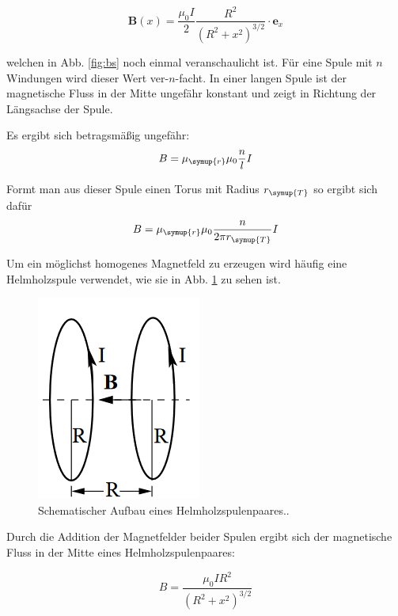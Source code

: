 \begin{equation}
  \symbf{B}(x)=\frac{\mu_0I}{2}\frac{R^2}{\left(R^2+x^2\right)^{3/2}}\cdot \symbf{e}_x
  \label{eqn:bswdg}
\end{equation}

welchen in Abb. \ref{fig:bs} noch einmal veranschaulicht ist.
Für eine Spule mit $n$ Windungen wird dieser Wert ver-$n$-facht.
In einer langen Spule ist der magnetische Fluss in der Mitte ungefähr
konstant und zeigt in Richtung der Längsachse der Spule.

Es ergibt sich betragsmäßig ungefähr:
\begin{equation}
  B = \mu_{\symup{r}}\mu_0\frac{n}{l}I
  \label{eqn:Bspule}
\end{equation}

Formt man aus dieser Spule einen Torus mit Radius $r_{\symup{T}}$
so ergibt sich dafür
\begin{equation}
  B = \mu_{\symup{r}}\mu_0\frac{n}{2\pi r_{\symup{T}}}I
  \label{eqn:Btorus}
\end{equation}

Um ein möglichst homogenes Magnetfeld zu erzeugen wird häufig
eine Helmholzspule verwendet, wie sie in Abb. \ref{fig:hh} zu sehen ist.

\begin{figure}
  \centering
  \includegraphics{content/images/Konzept Helmholz.png}
  \caption{Schematischer Aufbau eines Helmholzspulenpaares.\cite{anleitung}.}
  \label{fig:hh}
\end{figure}

Durch die Addition der Magnetfelder beider Spulen ergibt sich
der magnetische Fluss in der Mitte eines Helmholzspulenpaares:

\begin{equation}
  B=\frac{\mu_0IR^2}{\left(R^2+x^2\right)^{3/2}}
\end{equation}

